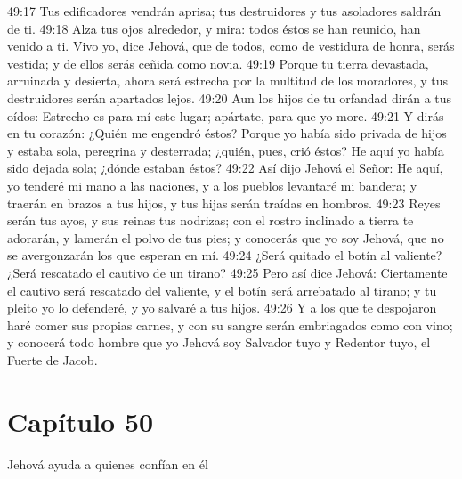 49:17 Tus edificadores vendrán aprisa; tus destruidores y tus asoladores saldrán de ti. 
49:18 Alza tus ojos alrededor, y mira: todos éstos se han reunido, han venido a ti. Vivo yo, dice Jehová, que de todos, como de vestidura de honra, serás vestida; y de ellos serás ceñida como novia. 
49:19 Porque tu tierra devastada, arruinada y desierta, ahora será estrecha por la multitud de los moradores, y tus destruidores serán apartados lejos. 
49:20 Aun los hijos de tu orfandad dirán a tus oídos: Estrecho es para mí este lugar; apártate, para que yo more. 
49:21 Y dirás en tu corazón: ¿Quién me engendró éstos? Porque yo había sido privada de hijos y estaba sola, peregrina y desterrada; ¿quién, pues, crió éstos? He aquí yo había sido dejada sola; ¿dónde estaban éstos? 
49:22 Así dijo Jehová el Señor: He aquí, yo tenderé mi mano a las naciones, y a los pueblos levantaré mi bandera; y traerán en brazos a tus hijos, y tus hijas serán traídas en hombros. 
49:23 Reyes serán tus ayos, y sus reinas tus nodrizas; con el rostro inclinado a tierra te adorarán, y lamerán el polvo de tus pies; y conocerás que yo soy Jehová, que no se avergonzarán los que esperan en mí. 
49:24 ¿Será quitado el botín al valiente? ¿Será rescatado el cautivo de un tirano? 
49:25 Pero así dice Jehová: Ciertamente el cautivo será rescatado del valiente, y el botín será arrebatado al tirano; y tu pleito yo lo defenderé, y yo salvaré a tus hijos. 
49:26 Y a los que te despojaron haré comer sus propias carnes, y con su sangre serán embriagados como con vino; y conocerá todo hombre que yo Jehová soy Salvador tuyo y Redentor tuyo, el Fuerte de Jacob. 
\section*{Capítulo 50 }
Jehová ayuda a quienes confían en él 
 
